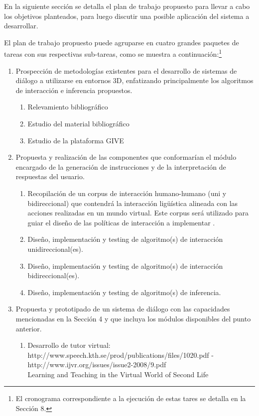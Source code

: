 En la siguiente secci\'on se detalla el plan de trabajo propuesto para llevar a cabo los objetivos planteados, para luego discutir una posible aplicaci\'on del sistema a desarrollar.


El plan de trabajo propuesto puede agruparse en cuatro grandes paquetes de tareas con sus respectivas sub-tareas, como se muestra a continuaci\'on:\footnote{El cronograma correspondiente a la ejecuci\'on de estas tares se detalla en la Secci\'on 8.}

\begin{enumerate}
    \item Prospecci\'on de metodolog\'ias existentes para el desarrollo de sistemas de di\'alogo a utilizarse en entornos 3D, enfatizando principalmente los algoritmos de interacci\'on e inferencia propuestos.
\begin{enumerate}
    \item Relevamiento bibliogr\'afico
    \item Estudio del material bibliogr\'afico
    \item Estudio de la plataforma GIVE
\end{enumerate}
\item Propuesta y realizaci\'on de las componentes que conformar\'ian el m\'odulo encargado de la generaci\'on de instrucciones y de la interpretaci\'on de respuestas del usuario.
\begin{enumerate}
\item Recopilaci\'on de un corpus de interacci\'on humano-humano (uni y bidireccional) que contendr\'a la interacci\'on lig\"u\'istica alineada con las acciones realizadas en un mundo virtual.  Este corpus ser\'a utilizado para guiar el dise\~no de las pol\'iticas de interacci\'on a implementar \citep{HCRC-93, byron-06}.
    \item Dise\~no, implementaci\'on y testing de algoritmo(s) de interacci\'on unidireccional(es).
    \item Dise\~no, implementaci\'on y testing de algoritmo(s) de interacci\'on bidireccional(es).
    \item Dise\~no, implementaci\'on y testing de algoritmo(s) de inferencia.
\end{enumerate}

\item Propuesta y prototipado de un sistema de di\'alogo con las capacidades mencionadas en la Secci\'on 4 y que incluya los m\'odulos disponibles del punto anterior.
\begin{enumerate}
    \item Desarrollo de tutor virtual:  http://www.speech.kth.se/prod/publications/files/1020.pdf - \\
http://www.ijvr.org/issues/issue2-2008/9.pdf \\
Learning and Teaching in the Virtual World of Second Life\\


\end{enumerate}
\end{enumerate}
